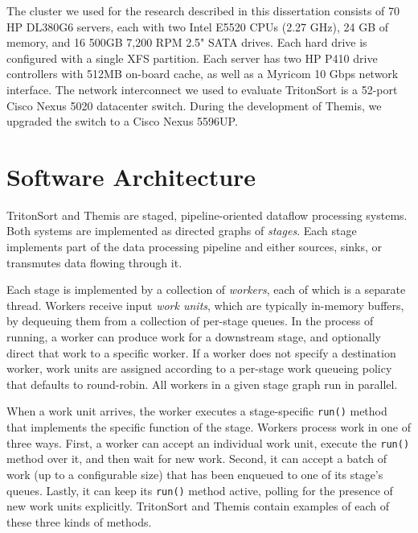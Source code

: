The cluster we used for the research described in this dissertation consists of
70 HP DL380G6 servers, each with two Intel E5520 CPUs (2.27 GHz), 24 GB of
memory, and 16 500GB 7,200 RPM 2.5" SATA drives. Each hard drive is configured
with a single XFS partition. Each server has two HP P410 drive controllers with
512MB on-board cache, as well as a Myricom 10 Gbps network interface. The
network interconnect we used to evaluate TritonSort is a 52-port Cisco Nexus
5020 datacenter switch. During the development of Themis, we upgraded the
switch to a Cisco Nexus 5596UP.

\section{Software Architecture}

TritonSort and Themis are staged, pipeline-oriented dataflow processing
systems. Both systems are implemented as directed graphs of \emph{stages}. Each
stage implements part of the data processing pipeline and either sources,
sinks, or transmutes data flowing through it.

Each stage is implemented by a collection of \emph{workers}, each of which is a
separate thread. Workers receive input \emph{work units}, which are typically
in-memory buffers, by dequeuing them from a collection of per-stage queues. In
the process of running, a worker can produce work for a downstream stage, and
optionally direct that work to a specific worker. If a worker
does not specify a destination worker, work units are assigned according to a
per-stage work queueing policy that defaults to round-robin. All workers in a
given stage graph run in parallel.

When a work unit arrives, the worker executes a stage-specific \texttt{run()}
method that implements the specific function of the stage. Workers process work
in one of three ways. First, a worker can accept an individual work unit,
execute the \texttt{run()} method over it, and then wait for new work. Second,
it can accept a batch of work (up to a configurable size) that has been
enqueued to one of its stage's queues. Lastly, it can keep its \texttt{run()}
method active, polling for the presence of new work units
explicitly. TritonSort and Themis contain examples of each of these three kinds
of methods.

